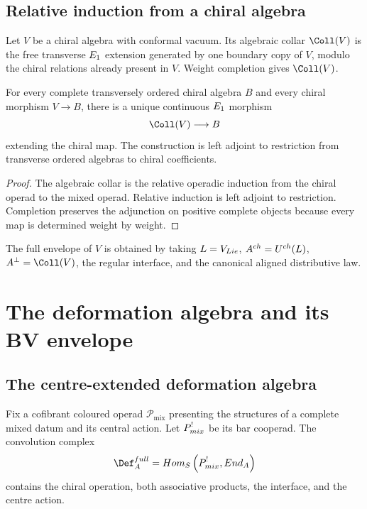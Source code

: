 \chapter{Relative induction from a chiral algebra}
Let $V$ be a chiral algebra with conformal vacuum.  Its algebraic collar $\Coll(V)$ is the free transverse $E_1$ extension generated by one boundary copy of $V$, modulo the chiral relations already present in $V$.  Weight completion gives $\widehat\Coll(V)$.

\begin{theorem}
For every complete transversely ordered chiral algebra $B$ and every chiral morphism $V\to B$, there is a unique continuous $E_1$ morphism
\[
 \widehat\Coll(V)\longrightarrow B
\]
extending the chiral map.  The construction is left adjoint to restriction from transverse ordered algebras to chiral coefficients.
\end{theorem}
\begin{proof}
The algebraic collar is the relative operadic induction from the chiral operad to the mixed operad.  Relative induction is left adjoint to restriction.  Completion preserves the adjunction on positive complete objects because every map is determined weight by weight.
\end{proof}

The full envelope of $V$ is obtained by taking $L=V_{Lie}$, $A^{ch}=U^{ch}(L)$, $A^\perp=\widehat\Coll(V)$, the regular interface, and the canonical aligned distributive law.

\part{The deformation algebra and its BV envelope}

\chapter{The centre-extended deformation algebra}
Fix a cofibrant coloured operad $\mathcal P_{\mathrm{mix}}$ presenting the structures of a complete mixed datum and its central action.  Let $\mathcal P_{\mathrm{mix}}^{\ash}$ be its bar cooperad.  The convolution complex
\[
 \Def_{\mathbb A}^{\mathrm{full}}
 =\Hom_{\mathbb S}
 \left(\mathcal P_{\mathrm{mix}}^{\ash},\End_{\mathbb A}\right)
\]
contains the chiral operation, both associative products, the interface, and the centre action.

